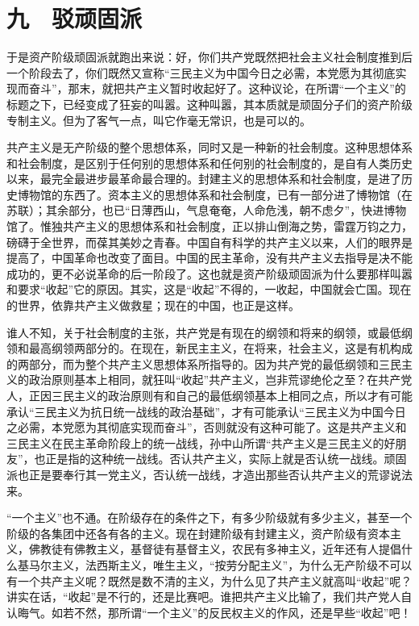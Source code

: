 \section{九　驳顽固派}

于是资产阶级顽固派就跑出来说：好，你们共产党既然把社会主义社会制度推到后一个阶段去了，你们既然又宣称“三民主义为中国今日之必需，本党愿为其彻底实现而奋斗”，那末，就把共产主义暂时收起好了。这种议论，在所谓“一个主义”的标题之下，已经变成了狂妄的叫嚣。这种叫嚣，其本质就是顽固分子们的资产阶级专制主义。但为了客气一点，叫它作毫无常识，也是可以的。

共产主义是无产阶级的整个思想体系，同时又是一种新的社会制度。这种思想体系和社会制度，是区别于任何别的思想体系和任何别的社会制度的，是自有人类历史以来，最完全最进步最革命最合理的。封建主义的思想体系和社会制度，是进了历史博物馆的东西了。资本主义的思想体系和社会制度，已有一部分进了博物馆（在苏联）；其余部分，也已“日薄西山，气息奄奄，人命危浅，朝不虑夕”，快进博物馆了。惟独共产主义的思想体系和社会制度，正以排山倒海之势，雷霆万钧之力，磅礴于全世界，而葆其美妙之青春。中国自有科学的共产主义以来，人们的眼界是提高了，中国革命也改变了面目。中国的民主革命，没有共产主义去指导是决不能成功的，更不必说革命的后一阶段了。这也就是资产阶级顽固派为什么要那样叫嚣和要求“收起”它的原因。其实，这是“收起”不得的，一收起，中国就会亡国。现在的世界，依靠共产主义做救星；现在的中国，也正是这样。

谁人不知，关于社会制度的主张，共产党是有现在的纲领和将来的纲领，或最低纲领和最高纲领两部分的。在现在，新民主主义，在将来，社会主义，这是有机构成的两部分，而为整个共产主义思想体系所指导的。因为共产党的最低纲领和三民主义的政治原则基本上相同，就狂叫“收起”共产主义，岂非荒谬绝伦之至？在共产党人，正因三民主义的政治原则有和自己的最低纲领基本上相同之点，所以才有可能承认“三民主义为抗日统一战线的政治基础”，才有可能承认“三民主义为中国今日之必需，本党愿为其彻底实现而奋斗”，否则就没有这种可能了。这是共产主义和三民主义在民主革命阶段上的统一战线，孙中山所谓“共产主义是三民主义的好朋友”，也正是指的这种统一战线。否认共产主义，实际上就是否认统一战线。顽固派也正是要奉行其一党主义，否认统一战线，才造出那些否认共产主义的荒谬说法来。

“一个主义”也不通。在阶级存在的条件之下，有多少阶级就有多少主义，甚至一个阶级的各集团中还各有各的主义。现在封建阶级有封建主义，资产阶级有资本主义，佛教徒有佛教主义，基督徒有基督主义，农民有多神主义，近年还有人提倡什么基马尔主义，法西斯主义，唯生主义，“按劳分配主义”，为什么无产阶级不可以有一个共产主义呢？既然是数不清的主义，为什么见了共产主义就高叫“收起”呢？讲实在话，“收起”是不行的，还是比赛吧。谁把共产主义比输了，我们共产党人自认晦气。如若不然，那所谓“一个主义”的反民权主义的作风，还是早些“收起”吧！

